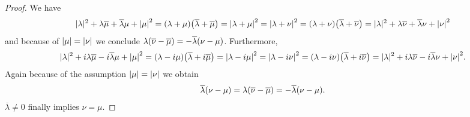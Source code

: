 \begin{proof}
	We have
	\begin{align*}
		|\lambda|^2 + \lambda \overline{\mu} + \overline{\lambda} \mu + {\left | \mu \right |}^2 = {\left ( \lambda + \mu \right )}{\left ( \overline{\lambda} + \overline{\mu} \right )} = {\left | \lambda + \mu \right |}^2 = {\left | \lambda + \nu \right |}^2 = {\left ( \lambda + \nu \right )}{\left ( \overline{\lambda} + \overline{\nu} \right )} = |\lambda|^2 + \lambda \overline{\nu} + \overline{\lambda} \nu + {\left | \nu \right |}^2
	\end{align*}
	and because of ${\left | \mu \right |} = {\left | \nu \right |}$ we conclude $\lambda{\left ( \overline{\nu} - \overline{\mu} \right )} = -\overline{\lambda} {\left ( \nu - \mu \right )}$. Furthermore,
	\begin{align*}
		|\lambda|^2 + i\lambda \overline{\mu} - i\overline{\lambda} \mu + {\left | \mu \right |}^2 = {\left ( \lambda - i\mu \right )}{\left ( \overline{\lambda} + i\overline{\mu} \right )} = {\left | \lambda - i\mu \right |}^2 = {\left | \lambda - i\nu \right |}^2 = {\left ( \lambda - i\nu \right )}{\left ( \overline{\lambda} + i\overline{\nu} \right )} = |\lambda|^2 + i\lambda \overline{\nu} - i\overline{\lambda} \nu + {\left | \nu \right |}^2.
	\end{align*}
	Again because of the assumption ${\left | \mu \right |} = {\left | \nu \right |}$ we obtain
	\begin{align*}
		\overline{\lambda} {\left ( \nu - \mu \right )} = \lambda{\left ( \overline{\nu} - \overline{\mu} \right )} = -\overline{\lambda} {\left ( \nu - \mu \right )}.
	\end{align*}
	$\overline{\lambda} \neq 0$ finally implies $\nu = \mu$.
\end{proof}